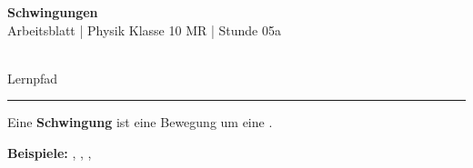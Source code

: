 \documentclass[11pt, a4paper]{article}
\newcommand{\fach}{Physik}
\newcommand{\thema}{Schwingungen}
\newcommand{\klasse}{10 MR}
\newcommand{\stunde}{05a}
\newcommand{\luecke}[1]{\underline{\hspace{#1}}}
\begin{document}

\begin{center}
    \begin{minipage}[c]{0.82\textwidth}
        \centering
        {\Large\bfseries\textcolor{fachfarbe}{\thema}}\\[0.2em]
        {\small Arbeitsblatt | \fach{} Klasse \klasse{} | Stunde \stunde}
    \end{minipage}%
    \hfill
    \begin{minipage}[c]{0.15\textwidth}
        \raggedleft
        \\[-2pt]
        {\tiny\textcolor{mittelgrau}{Lernpfad}}
    \end{minipage}
\end{center}
\vspace{-0.3em}
\hrule
\vspace{0.6em}


\begin{merkkasten}[title={\textbf{K1: Was ist eine Schwingung?}}]
Eine \textbf{Schwingung} ist eine \luecke{4cm} Bewegung um eine \luecke{3cm}.

\vspace{0.3em}
\textbf{Beispiele:} \luecke{2.5cm}, \luecke{2.5cm}, \luecke{2.5cm}, \luecke{2.5cm}
\end{merkkasten}

\end{document}
